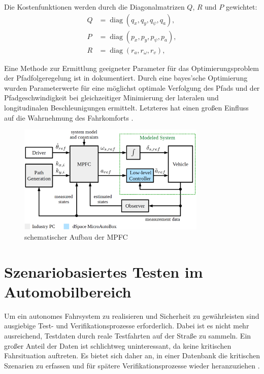 \noindent Die Kostenfunktionen werden durch die Diagonalmatrizen $Q$, $R$ und $P$ gewichtet:
\begin{equation}
    \begin{split}
        Q &= \operatorname{diag}(q_x, q_y, q_\psi, q_a), \\
        P &= \operatorname{diag}(p_x, p_y, p_\psi, p_a), \\
        R &= \operatorname{diag}(r_a, r_\omega, r_v),
    \end{split}
\end{equation}





Eine Methode zur Ermittlung geeigneter Parameter für das Optimierungsproblem der Pfadfolgeregelung ist in \cite{math11020465} dokumentiert. Durch eine bayes'sche Optimierung wurden Parameterwerte für eine möglichst optimale Verfolgung des Pfads und der Pfadgeschwindigkeit bei gleichzeitiger Minimierung der lateralen und longitudinalen Beschleunigungen ermittelt. Letzteres hat einen großen Einfluss auf die Wahrnehmung des Fahrkomforts \cite{BELLEM201890}.
\begin{figure}[H]
    \centering
    \includegraphics[width=0.8\textwidth]{figures/2_Grundlagen/MPFC_Schema.png}
    \caption{schematischer Aufbau der MPFC \cite{ritschel2019}}
    \label{fig:MPFC_Schema}
\end{figure}
    
\section{Szenariobasiertes Testen im Automobilbereich} \label{sec:SoftwaretestsAutomobil}

Um ein autonomes Fahrsystem zu realisieren und Sicherheit zu gewährleisten sind ausgiebige Test- und Verifikationsprozesse erforderlich. Dabei ist es nicht mehr ausreichend, Testdaten durch reale Testfahrten auf der Straße zu sammeln. Ein großer Anteil der Daten ist schlichtweg uninteressant, da keine kritischen Fahrsituation auftreten. Es bietet sich daher an, in einer Datenbank die kritischen Szenarien zu erfassen und für spätere Verifikationsprozesse wieder heranzuziehen \cite{Nalic2020}.

